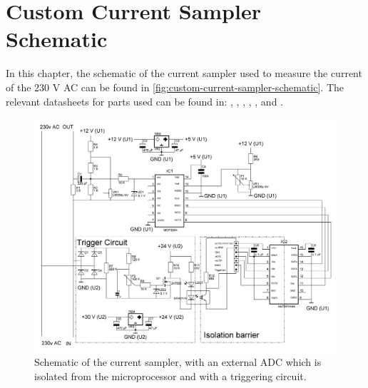
\chapter{Custom Current Sampler Schematic}
\label{app:custom-current-sampler-schematic}

In this chapter, the schematic of the current sampler used to measure the current of the 230 V AC can be found in \autoref{fig:custom-current-sampler-schematic}.
The relevant datasheets for parts used can be found in: \cite{lm7824-vr-datasheet}, \cite{lm7805-vr-datasheet}, \cite{lm336z-ref-voltage-datasheet}, \cite{mcp3204-adc-datasheet}, \cite{iso7241m-spi-isolator-datasheet}, \cite{2n7000-n-fet-datasheet} and \cite{sfh617a-optocoupler-datasheet}.


\begin{figure}[htb]
	\includegraphics[angle=90,width=\textwidth,height=.9\textheight,keepaspectratio]{chapters/appendix/custom-current-sampler/custom-current-sampler-schematic.jpg}
	\caption{Schematic of the current sampler, with an external ADC which is isolated from the microprocessor and with a triggering circuit.}
	\label{fig:custom-current-sampler-schematic}
\end{figure}
